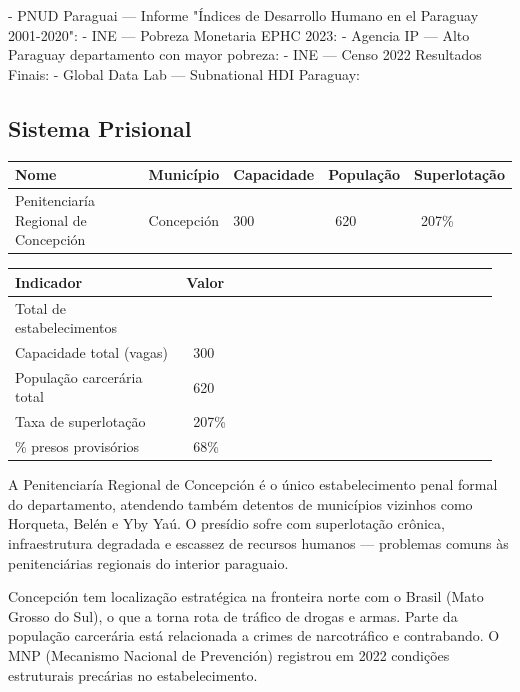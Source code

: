 - PNUD Paraguai --- Informe "Índices de Desarrollo Humano en el Paraguay 2001-2020": 
- INE --- Pobreza Monetaria EPHC 2023: 
- Agencia IP --- Alto Paraguay departamento con mayor pobreza: 
- INE --- Censo 2022 Resultados Finais: 
- Global Data Lab --- Subnational HDI Paraguay: 


\subsection{Sistema Prisional}



{\small
\setlength{\tabcolsep}{3pt}
\renewcommand{\arraystretch}{1.12}
{\small
\begin{tabularx}{\linewidth}{lXXXX}
\toprule
Nome & Município & Capacidade & População & Superlotação \\
\midrule
Penitenciaría Regional de Concepción & Concepción & 300 & ~620 & ~207\% \\
\bottomrule
\end{tabularx}
}
}


{\small
\setlength{\tabcolsep}{3pt}
\renewcommand{\arraystretch}{1.12}
\begin{tabularx}{\linewidth}{>{\raggedright\arraybackslash}p{0.34\linewidth} >{\raggedright\arraybackslash}p{0.62\linewidth}}
\toprule
Indicador & Valor \\
\midrule
Total de estabelecimentos & 1 \\
Capacidade total (vagas) & ~300 \\
População carcerária total & ~620 \\
Taxa de superlotação & ~207\% \\
\% presos provisórios & ~68\% \\
\bottomrule
\end{tabularx}
}


A Penitenciaría Regional de Concepción é o único estabelecimento penal formal do departamento, atendendo também detentos de municípios vizinhos como Horqueta, Belén e Yby Yaú. O presídio sofre com superlotação crônica, infraestrutura degradada e escassez de recursos humanos --- problemas comuns às penitenciárias regionais do interior paraguaio.

Concepción tem localização estratégica na fronteira norte com o Brasil (Mato Grosso do Sul), o que a torna rota de tráfico de drogas e armas. Parte da população carcerária está relacionada a crimes de narcotráfico e contrabando. O MNP (Mecanismo Nacional de Prevención) registrou em 2022 condições estruturais precárias no estabelecimento.

